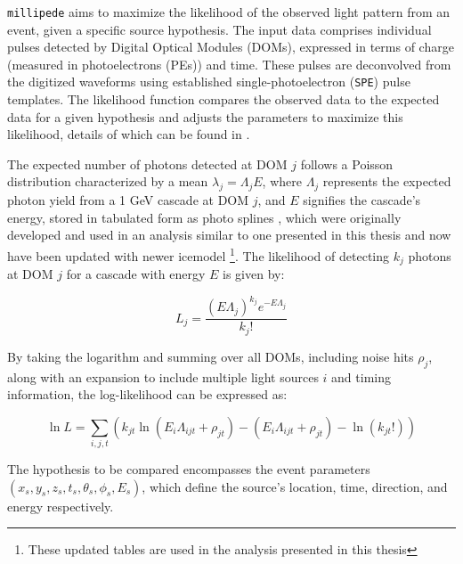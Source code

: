 \texttt{millipede} aims to maximize the likelihood of the observed light pattern from an event, given a specific source hypothesis. The input data comprises individual pulses detected by Digital Optical Modules (DOMs), expressed in terms of charge (measured in photoelectrons (PEs)) and time. These pulses are deconvolved from the digitized waveforms using established single-photoelectron (\texttt{SPE}) pulse templates. The likelihood function compares the observed data to the expected data for a given hypothesis and adjusts the parameters to maximize this likelihood, details of which can be found in .

The expected number of photons detected at DOM $j$ follows a Poisson distribution characterized by a mean $\lambda_j = \Lambda_j E$, where $\Lambda_j$ represents the expected photon yield from a 1 GeV cascade at DOM $j$, and $E$ signifies the cascade's energy, stored in tabulated form as photo splines , which were originally developed and used in an analysis similar to one presented in this thesis  and now have been updated with newer icemodel  \footnote{These updated tables are used in the analysis presented in this thesis}. The likelihood of detecting $k_j$ photons at DOM $j$ for a cascade with energy $E$ is given by:

\begin{equation}
    L_j = \frac{(E \Lambda_j)^{k_j} e^{-E \Lambda_j}}{k_j!}
\end{equation}

By taking the logarithm and summing over all DOMs, including noise hits $\rho_j$, along with an expansion to include multiple light sources $i$ and timing information, the log-likelihood can be expressed as:

\begin{equation}\label{eq:millipede_llh}
    \ln L = \sum_{i,j,t} \left( k_{jt} \ln(E_i \Lambda_{ijt} + \rho_{jt}) - (E_i \Lambda_{ijt} + \rho_{jt}) - \ln(k_{jt}!) \right)
\end{equation}

The hypothesis to be compared encompasses the event parameters $(x_s, y_s, z_s, t_s, \theta_s, \phi_s, E_s)$, which define the source's location, time, direction, and energy respectively. 


